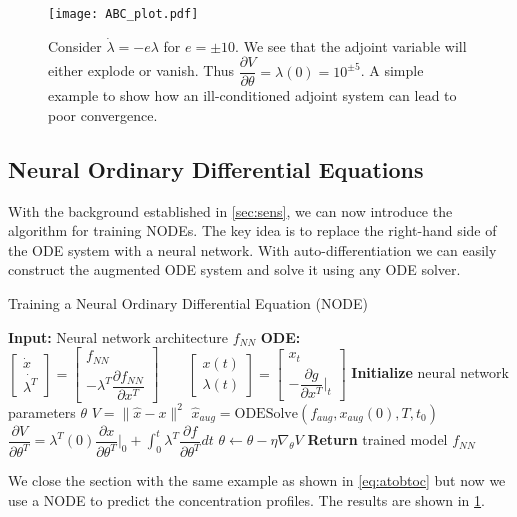 \documentclass[fontsize=11pt]{article}
\newcommand{\norm}[1]{\lVert #1 \rVert}
\theoremstyle{definition}
\begin{document}
\begin{figure}[h]
    \centering
    \texttt{[image: ABC\_plot.pdf]} 
    \caption{Consider $\dot{\lambda} = -e \lambda$ for $e = \pm 10$. 
    We see that the adjoint variable will either explode or vanish.
    Thus $\dfrac{\partial V}{\partial \theta} = \lambda(0) = 10^{\pm 5}$. 
    A simple example to show how an ill-conditioned
    adjoint system can lead to poor convergence.}
    \label{fig:node}
\end{figure}

\subsection{Neural Ordinary Differential Equations}

With the background established in \cref{sec:sens}, we can now introduce the algorithm
for training NODEs. The key idea is to replace the right-hand side of the ODE system
with a neural network. With auto-differentiation we can easily construct the augmented
ODE system and solve it using any ODE solver. 

\begin{algorithm}[h]
\caption{Training a Neural Ordinary Differential Equation (NODE)}
\label{alg:NODE}
\begin{algorithmic}[1]
\State \textbf{Input:} Neural network architecture $f_{NN}$
\State \textbf{ODE:} 
$
    \begin{bmatrix} \dot{x} \\ \dot{\lambda^T} \end{bmatrix} = 
    \begin{bmatrix} f_{NN} \\ -\lambda^T \dfrac{\partial f_{NN}}{\partial x^T}\end{bmatrix}
    \qquad
    \begin{bmatrix} x(t) \\ \lambda(t) \end{bmatrix} =
    \begin{bmatrix} x_t \\ - \dfrac{\partial g}{\partial x^T}|_{t} \end{bmatrix}
    \label{eq:augsens}
$
\State \textbf{Initialize} neural network parameters $\theta$
\Repeat
    \State $V = \norm{\hat{x} - x}^2$
    \State $\hat{x}_{aug} = \text{ODESolve}(f_{aug}, x_{aug}(0), T, t_0)$
    \State $\dfrac{\partial V}{\partial \theta^T} = \lambda^T(0)\dfrac{\partial x}{\partial \theta^T}|_0 + \int_0^t   \lambda^T \dfrac{\partial f}{\partial \theta^T} dt$
    \State $\theta \leftarrow \theta - \eta \nabla_{\theta} V$
\State \textbf{Return} trained model $f_{NN}$
\end{algorithmic}
\end{algorithm}
We close the section with the same example as shown in \cref{eq:atobtoc} but now
we use a NODE to predict the concentration profiles. The results are shown in
\cref{fig:node}.
\end{document}
